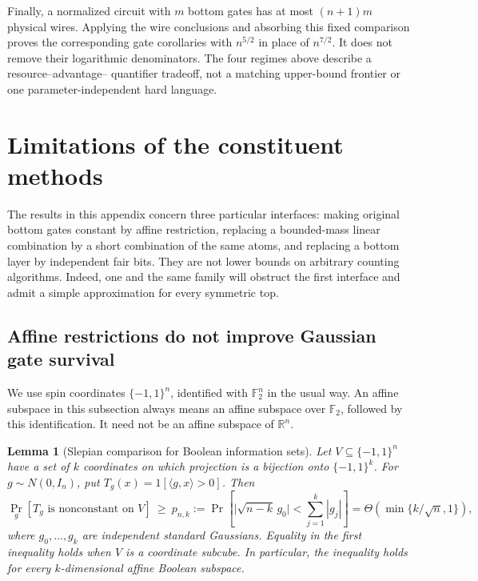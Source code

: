 \documentclass[11pt,letterpaper]{article}
\newtheorem{lemma}[theorem]{Lemma}
\theoremstyle{definition}
\theoremstyle{remark}
\begin{document}
Finally, a normalized circuit with $m$ bottom gates has at most
$(n+1)m$ physical wires. Applying the wire conclusions and absorbing
this fixed comparison proves the corresponding gate corollaries with
$n^{5/2}$ in place of $n^{7/2}$. It does not remove their logarithmic
denominators. The four regimes above describe a resource--advantage--
quantifier tradeoff, not a matching upper-bound frontier or one
parameter-independent hard language.


\section{Limitations of the constituent methods}
\label{lim:appendix}

The results in this appendix concern three particular interfaces: making
original bottom gates constant by affine restriction, replacing a bounded-mass
linear combination by a short combination of the same atoms, and replacing a
bottom layer by independent fair bits.  They are not lower bounds on arbitrary
counting algorithms.  Indeed, one and the same family will obstruct the first
interface and admit a simple approximation for every symmetric top.

\subsection{Affine restrictions do not improve Gaussian gate survival}
\label{lim:affine}

We use spin coordinates $\{-1,1\}^n$, identified with $\mathbb F_2^n$ in the
usual way.  An affine subspace in this subsection always means an affine
subspace over $\mathbb F_2$, followed by this identification.  It need not be
an affine subspace of $\mathbb R^n$.

\begin{lemma}[Slepian comparison for Boolean information sets]
\label{lim:slepian}
Let $V\subseteq\{-1,1\}^n$ have a set of $k$ coordinates on which projection
is a bijection onto $\{-1,1\}^k$.  For $g\sim N(0,I_n)$, put
$T_g(x)=1[\langle g,x\rangle>0]$.  Then
\begin{equation}
 \Pr_g[T_g\text{ is nonconstant on }V]
\ \ge\ p_{n,k}:=\Pr\left[
       \big|\sqrt{n-k}\,g_0\big|<\sum_{j=1}^k|g_j|\right]
 =\Theta\left(\min\{k/\sqrt n,1\}\right),
 \label{lim:survival}
\end{equation}
where $g_0,\ldots,g_k$ are independent standard Gaussians.  Equality in the
first inequality holds when $V$ is a coordinate subcube.  In particular, the
inequality holds for every $k$-dimensional affine Boolean subspace.
\end{lemma}
\end{document}
